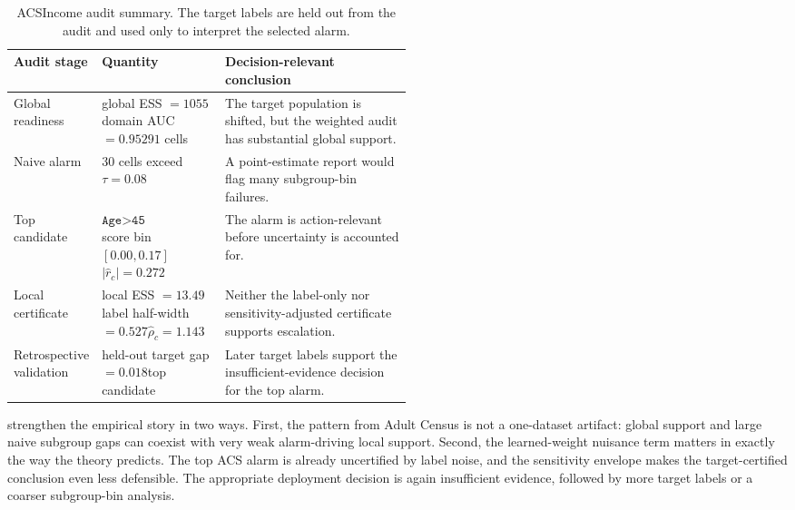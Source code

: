 \begin{table}[t]
\centering
\caption{ACSIncome audit summary. The target labels are held out from the audit and used only to interpret the selected alarm.}
\label{tab:acs-operational}
{\small
\setlength{\tabcolsep}{5pt}
\renewcommand{\arraystretch}{1.18}
\begin{tabularx}{\linewidth}{@{}L{0.20\linewidth}L{0.31\linewidth}Y@{}}
\toprule
Audit stage & Quantity & Decision-relevant conclusion \\
\midrule
Global readiness & global ESS \(=1055\)\newline domain AUC \(=0.952\)\newline \(91\) cells & The target population is shifted, but the weighted audit has substantial global support. \\
Naive alarm & \(30\) cells exceed \(\tau=0.08\) & A point-estimate report would flag many subgroup-bin failures. \\
Top candidate & \(\texttt{Age>45 \& Bachelor+}\)\newline score bin \([0.00,0.17]\)\newline \(|\widehat r_c|=0.272\) & The alarm is action-relevant before uncertainty is accounted for. \\
Local certificate & local ESS \(=13.49\)\newline label half-width \(=0.527\)\newline \(\widehat\rho_c=1.143\) & Neither the label-only nor sensitivity-adjusted certificate supports escalation. \\
Retrospective validation & held-out target gap \(=0.018\)\newline top candidate & Later target labels support the insufficient-evidence decision for the top alarm. \\
\bottomrule
\end{tabularx}
}
\end{table}

 strengthen the empirical story in two ways. First, the pattern from Adult Census is not a one-dataset artifact: global support and large naive subgroup gaps can coexist with very weak alarm-driving local support. Second, the learned-weight nuisance term matters in exactly the way the theory predicts. The top ACS alarm is already uncertified by label noise, and the sensitivity envelope makes the target-certified conclusion even less defensible. The appropriate deployment decision is again insufficient evidence, followed by more target labels or a coarser subgroup-bin analysis.
